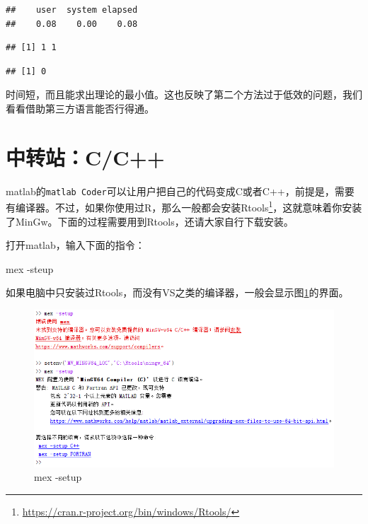 \documentclass[]{ctexbook}
\newenvironment{Shaded}{\begin{snugshade}}{\end{snugshade}}
\newcommand{\OperatorTok}[1]{\textcolor[rgb]{0.81,0.36,0.00}{\textbf{#1}}}
\newcommand{\NormalTok}[1]{#1}
\renewcommand{\href}[2]{#2\footnote{\url{#1}}}
\theoremstyle{definition}
\theoremstyle{definition}
\theoremstyle{definition}
\theoremstyle{remark}
\begin{document}
\begin{verbatim}
##    user  system elapsed 
##    0.08    0.00    0.08
\end{verbatim}

\begin{Shaded}
\end{Shaded}

\begin{verbatim}
## [1] 1 1
\end{verbatim}

\begin{Shaded}
\end{Shaded}

\begin{verbatim}
## [1] 0
\end{verbatim}

时间短，而且能求出理论的最小值。这也反映了第二个方法过于低效的问题，我们看看借助第三方语言能否行得通。

\section{中转站：C/C++}\label{cc}

matlab的\texttt{matlab\ Coder}可以让用户把自己的代码变成C或者C++，前提是，需要有编译器。不过，如果你使用过R，那么一般都会安装\href{https://cran.r-project.org/bin/windows/Rtools/}{Rtools}，这就意味着你安装了MinGw。下面的过程需要用到Rtools，还请大家自行下载安装。

打开matlab，输入下面的指令：

\begin{Shaded}
\begin{Highlighting}[]
\NormalTok{mex -steup}
\end{Highlighting}
\end{Shaded}

如果电脑中只安装过Rtools，而没有VS之类的编译器，一般会显示图\ref{fig:mex}的界面。

\begin{figure}

{\centering \includegraphics[width=0.95\linewidth]{img/mex} 

}

\caption{mex -setup}\label{fig:mex}
\end{figure}
\end{document}
